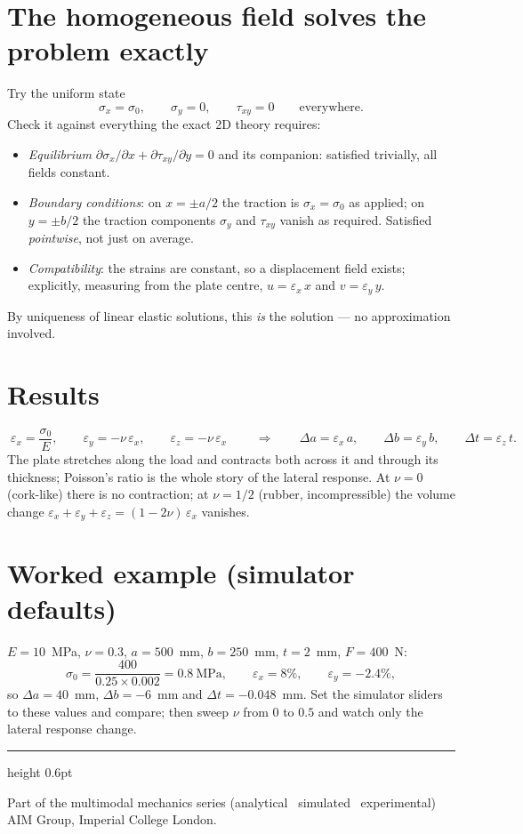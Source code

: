 \documentclass[10pt,a4paper]{article}
\begin{document}
\section*{The homogeneous field solves the problem exactly}
Try the uniform state
\begin{equation}
\sigma_x = \sigma_0, \qquad \sigma_y = 0, \qquad \tau_{xy} = 0
\qquad \text{everywhere.}
\end{equation}
Check it against everything the exact 2D theory requires:
\begin{itemize}
\setlength\itemsep{2pt}
\item \emph{Equilibrium} $\partial\sigma_x/\partial x + \partial\tau_{xy}/\partial y = 0$
      and its companion: satisfied trivially, all fields constant.
\item \emph{Boundary conditions}: on $x = \pm a/2$ the traction is
      $\sigma_x = \sigma_0$ as applied; on $y = \pm b/2$ the traction components
      $\sigma_y$ and $\tau_{xy}$ vanish as required. Satisfied \emph{pointwise},
      not just on average.
\item \emph{Compatibility}: the strains are constant, so a displacement field
      exists; explicitly, measuring from the plate centre,
      $u = \varepsilon_x\, x$ and $v = \varepsilon_y\, y$.
\end{itemize}
By uniqueness of linear elastic solutions, this \emph{is} the solution --- no
approximation involved.

\section*{Results}
\begin{equation}
\boxed{\;
\varepsilon_x = \frac{\sigma_0}{E}, \qquad
\varepsilon_y = -\nu\,\varepsilon_x, \qquad
\varepsilon_z = -\nu\,\varepsilon_x
\;}
\qquad\Rightarrow\qquad
\Delta a = \varepsilon_x\, a, \qquad
\Delta b = \varepsilon_y\, b, \qquad
\Delta t = \varepsilon_z\, t .
\end{equation}
The plate stretches along the load and contracts both across it and through its
thickness; Poisson's ratio is the whole story of the lateral response. At
$\nu = 0$ (cork-like) there is no contraction; at $\nu = 1/2$ (rubber,
incompressible) the volume change
$\varepsilon_x + \varepsilon_y + \varepsilon_z = (1 - 2\nu)\,\varepsilon_x$
vanishes.

\section*{Worked example (simulator defaults)}
$E = 10$~MPa, $\nu = 0.3$, $a = 500$~mm, $b = 250$~mm, $t = 2$~mm, $F = 400$~N:
\begin{equation}
\sigma_0 = \frac{400}{0.25 \times 0.002} = 0.8~\text{MPa}, \qquad
\varepsilon_x = 8\%, \qquad \varepsilon_y = -2.4\%,
\end{equation}
so $\Delta a = 40$~mm, $\Delta b = -6$~mm and $\Delta t = -0.048$~mm. Set the
simulator sliders to these values and compare; then sweep $\nu$ from $0$ to
$0.5$ and watch only the lateral response change.

\vfill
{\color{celline}\hrule height 0.6pt}
\smallskip
{\footnotesize\textcolor{celdark}{Part of the multimodal mechanics series
(analytical \textperiodcentered\ simulated \textperiodcentered\ experimental)
\,\textperiodcentered\, AIM Group, Imperial College London.}}
\end{document}

